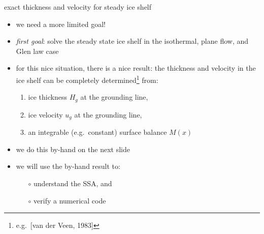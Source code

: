 \begin{frame}{exact thickness and velocity for steady ice shelf}


\begin{itemize}
\item we need a more limited goal!
\item \emph{first goal}:  solve the steady state ice shelf in the isothermal, plane flow, and Glen law case
\item for this nice situation, there is a nice result: the thickness and velocity in the ice shelf can be completely determined\footnote{e.g.~[van der Veen, 1983]} from:
  \begin{enumerate}
  \item ice thickness $H_g$ at the grounding line,
  \item ice velocity $u_g$ at the grounding line,
  \item an integrable (e.g.~constant) surface balance $M(x)$
  \end{enumerate}
\item we do this by-hand on the next slide
\item we will use the by-hand result to:
  \begin{itemize}
  \item[$\circ$] understand the SSA, and
  \item[$\circ$] verify a numerical code
  \end{itemize}
\end{itemize}
\end{frame}



